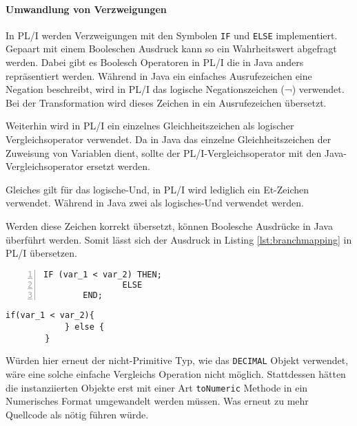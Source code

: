 \paragraph{Umwandlung von Verzweigungen}

In PL/I werden Verzweigungen mit den Symbolen \verb+IF+ und \verb+ELSE+ implementiert. 
Gepaart mit einem Booleschen Ausdruck kann so ein Wahrheitswert abgefragt werden.
Dabei gibt es Boolesch Operatoren in PL/I die in Java anders repräsentiert werden.
Während in Java ein einfaches Ausrufezeichen eine Negation beschreibt, wird in PL/I das logische Negationszeichen (¬) verwendet. Bei der Transformation wird dieses Zeichen in ein Ausrufezeichen übersetzt.

Weiterhin wird in PL/I ein einzelnes Gleichheitszeichen als logischer Vergleichsoperator verwendet. Da in Java das einzelne Gleichheitszeichen der Zuweisung von Variablen dient, sollte der PL/I-Vergleichsoperator mit den Java-Vergleichsoperator ersetzt werden.

Gleiches gilt für das logische-Und, in PL/I wird lediglich ein Et-Zeichen verwendet. Während in Java zwei als logisches-Und verwendet werden.

Werden diese Zeichen korrekt übersetzt, können Boolesche Ausdrücke in Java überführt werden.
Somit lässt sich der Ausdruck in Listing \ref{lst:branchmapping} in PL/I übersetzen.

\begin{minipage}[b]{0.48\linewidth}
	\centering
	\lstset{language=PL/I,label=SliceExaple}
	\begin{lstlisting}[frame=single, numbers=left, mathescape,%
		caption={Verzweigungen}, label={lst:branchmapping}]	
		IF (var_1 < var_2) THEN;
				ELSE
		END;
	\end{lstlisting}
\end{minipage}
\hspace{0.5cm}
\begin{minipage}[b]{0.48\linewidth}
	\centering
	\lstset{language=Java,label=SliceExaple}
	\begin{lstlisting}[frame=single, mathescape,%
		title={" "}]
		if(var_1 < var_2){	
			} else {
		}
	\end{lstlisting}
\end{minipage} 

Würden hier erneut der nicht-Primitive Typ, wie das \verb+DECIMAL+ Objekt verwendet, wäre eine solche einfache Vergleichs Operation nicht möglich.
Stattdessen hätten die instanziierten Objekte erst mit einer Art \verb+toNumeric+ Methode in ein Numerisches Format umgewandelt werden müssen.
Was erneut zu mehr Quellcode als nötig führen würde.

